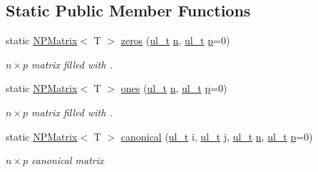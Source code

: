 \subsection*{Static Public Member Functions}
\begin{DoxyCompactItemize}
\item 
static \mbox{\hyperlink{class_n_p_matrix}{N\+P\+Matrix}}$<$ T $>$ \mbox{\hyperlink{class_n_p_matrix_a701c8f60b4b8b727fccb063cd6f0784b}{zeros}} (\mbox{\hyperlink{typedef_8h_a1b140a2034db3f5dfe18a987745df43a}{ul\+\_\+t}} \mbox{\hyperlink{class_n_p_matrix_afc181b7652d9427125c72c38d7c1498d}{n}}, \mbox{\hyperlink{typedef_8h_a1b140a2034db3f5dfe18a987745df43a}{ul\+\_\+t}} \mbox{\hyperlink{class_n_p_matrix_a3beee8acb5babf62d2b4f212ac5d18e8}{p}}=0)
\begin{DoxyCompactList}\small\item\em $ n \times p $ matrix filled with {}. \end{DoxyCompactList}\item 
static \mbox{\hyperlink{class_n_p_matrix}{N\+P\+Matrix}}$<$ T $>$ \mbox{\hyperlink{class_n_p_matrix_a6509ca1d29b8b87f2d437883f48a40c9}{ones}} (\mbox{\hyperlink{typedef_8h_a1b140a2034db3f5dfe18a987745df43a}{ul\+\_\+t}} \mbox{\hyperlink{class_n_p_matrix_afc181b7652d9427125c72c38d7c1498d}{n}}, \mbox{\hyperlink{typedef_8h_a1b140a2034db3f5dfe18a987745df43a}{ul\+\_\+t}} \mbox{\hyperlink{class_n_p_matrix_a3beee8acb5babf62d2b4f212ac5d18e8}{p}}=0)
\begin{DoxyCompactList}\small\item\em $ n \times p $ matrix filled with {}. \end{DoxyCompactList}\item 
static \mbox{\hyperlink{class_n_p_matrix}{N\+P\+Matrix}}$<$ T $>$ \mbox{\hyperlink{class_n_p_matrix_abda10c35b77af6785cb5cf069ff099e7}{canonical}} (\mbox{\hyperlink{typedef_8h_a1b140a2034db3f5dfe18a987745df43a}{ul\+\_\+t}} i, \mbox{\hyperlink{typedef_8h_a1b140a2034db3f5dfe18a987745df43a}{ul\+\_\+t}} j, \mbox{\hyperlink{typedef_8h_a1b140a2034db3f5dfe18a987745df43a}{ul\+\_\+t}} \mbox{\hyperlink{class_n_p_matrix_afc181b7652d9427125c72c38d7c1498d}{n}}, \mbox{\hyperlink{typedef_8h_a1b140a2034db3f5dfe18a987745df43a}{ul\+\_\+t}} \mbox{\hyperlink{class_n_p_matrix_a3beee8acb5babf62d2b4f212ac5d18e8}{p}}=0)
\begin{DoxyCompactList}\small\item\em $ n \times p $ canonical matrix \end{DoxyCompactList}\item 

\end{DoxyCompactItemize}
